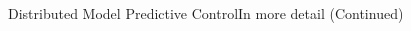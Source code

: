 \documentclass[aspectratio=169]{beamer}
\begin{document}
\begin{frame}{Distributed Model Predictive Control}{In more detail (Continued)}
\begin{overlayarea}{\textwidth}{.5\textwidth}
  \end{overlayarea}
\end{frame}
\end{document}

